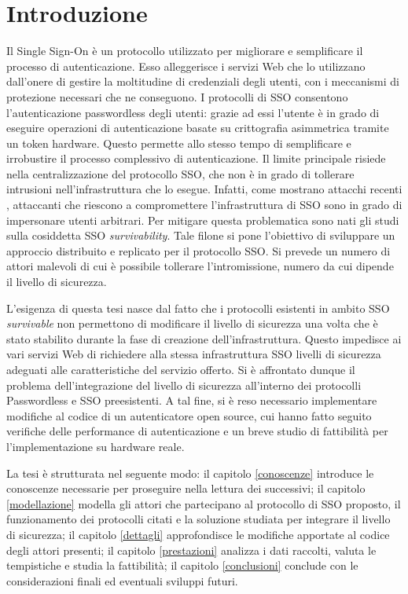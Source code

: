 \chapter{Introduzione}
\label{intro}

Il Single Sign-On è un protocollo utilizzato per migliorare e semplificare il processo di autenticazione. Esso alleggerisce i servizi Web che lo utilizzano dall'onere di gestire la moltitudine di credenziali degli utenti, con i meccanismi di protezione necessari che ne conseguono. I protocolli di SSO consentono l'autenticazione passwordless degli utenti: grazie ad essi l'utente è in grado di eseguire operazioni di autenticazione basate su crittografia asimmetrica tramite un token hardware. Questo permette allo stesso tempo di semplificare e irrobustire il processo complessivo di autenticazione. Il limite principale risiede nella centralizzazione del protocollo SSO, che non è in grado di tollerare intrusioni nell'infrastruttura che lo esegue.
Infatti, come mostrano attacchi recenti \cite{volexity:solarwinds} \cite{nsa:authentication}, attaccanti che riescono a compromettere l'infrastruttura di SSO sono in grado di impersonare utenti arbitrari.
Per mitigare questa problematica sono nati gli studi sulla cosiddetta SSO \emph{survivability}. Tale filone si pone l'obiettivo di sviluppare un approccio distribuito e replicato per il protocollo SSO. Si prevede un numero di attori malevoli di cui è possibile tollerare l'intromissione, numero da cui dipende il livello di sicurezza.

L'esigenza di questa tesi nasce dal fatto che i protocolli esistenti in ambito SSO \emph{survivable} non permettono di modificare il livello di sicurezza una volta che è stato stabilito durante la fase di creazione dell'infrastruttura. Questo impedisce ai vari servizi Web di richiedere alla stessa infrastruttura SSO livelli di sicurezza adeguati alle caratteristiche del servizio offerto. Si è affrontato dunque il problema dell'integrazione del livello di sicurezza all'interno dei protocolli Passwordless e SSO preesistenti. A tal fine, si è reso necessario implementare modifiche al codice di un autenticatore open source, cui hanno fatto seguito verifiche delle performance di autenticazione e un breve studio di fattibilità per l'implementazione su hardware reale.

La tesi è strutturata nel seguente modo: il capitolo \ref{conoscenze} introduce le conoscenze necessarie per proseguire nella lettura dei successivi; il capitolo \ref{modellazione} modella gli attori che partecipano al protocollo di SSO proposto, il funzionamento dei protocolli citati e la soluzione studiata per integrare il livello di sicurezza; il capitolo \ref{dettagli} approfondisce le modifiche apportate al codice degli attori presenti; il capitolo \ref{prestazioni} analizza i dati raccolti, valuta le tempistiche e studia la fattibilità; il capitolo \ref{conclusioni} conclude con le considerazioni finali ed eventuali sviluppi futuri.
